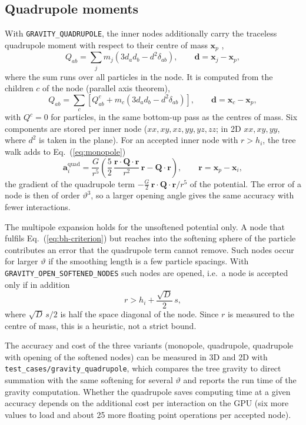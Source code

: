 \documentclass[10pt,fleqn,twoside]{article}
\renewcommand{\vec}[1]{{\mathbf #1}}
\newcommand{\code}[1]{\texttt{#1}}
\newcommand{\sw}[1]{\texttt{#1}}
\begin{document}
\subsection{Quadrupole moments}
\label{sec:quadrupole}
With \sw{GRAVITY\_QUADRUPOLE}, the inner nodes additionally carry the traceless quadrupole moment with respect to
their centre of mass $\vec x_p$ \citep{1987ApJS...64..715H},
\begin{equation}
 Q_{ab} = \sum_j m_j \left(3 d_a d_b - d^2 \delta_{ab}\right), \qquad \vec d = \vec x_j - \vec x_p,
\end{equation}
where the sum runs over all particles in the node. It is computed from the children $c$ of the node (parallel axis
theorem),
\begin{equation}
 Q_{ab} = \sum_c \left[ Q^c_{ab} + m_c \left(3 d_a d_b - d^2 \delta_{ab}\right)\right], \qquad
 \vec d = \vec x_c - \vec x_p,
\end{equation}
with $Q^c = 0$ for particles, in the same bottom-up pass as the centres of mass. Six components are stored per inner
node ($xx, xy, xz, yy, yz, zz$; in 2D $xx, xy, yy$, where $d^2$ is taken in the plane). For an accepted inner node
with $r > h_i$, the tree walk adds to Eq.~(\ref{eq:monopole})
\begin{equation}
 \vec a_i^\mathrm{quad} = \frac{G}{r^5}\left(\frac{5}{2}\,\frac{\vec r\cdot\mathbf Q\cdot\vec r}{r^2}\,\vec r
 - \mathbf Q\cdot\vec r\right), \qquad \vec r = \vec x_p - \vec x_i,
\end{equation}
the gradient of the quadrupole term $-\frac{G}{2}\,\vec r\cdot\mathbf Q\cdot\vec r/r^5$ of the potential. The
error of a node is then of order $\vartheta^3$, so a larger opening angle gives the same accuracy with fewer
interactions.

The multipole expansion holds for the unsoftened potential only. A node that fulfils Eq.~(\ref{eq:bh-criterion})
but reaches into the softening sphere of the particle contributes an error that the quadrupole term cannot remove.
Such nodes occur for larger $\vartheta$ if the smoothing length is a few particle spacings. With
\sw{GRAVITY\_OPEN\_SOFTENED\_NODES} such nodes are opened, i.e.\ a node is accepted only if in addition
\begin{equation}
 r > h_i + \frac{\sqrt{D}}{2}\, s,
\end{equation}
where $\sqrt{D}\,s/2$ is half the space diagonal of the node. Since $r$ is measured to the centre of mass, this is a
heuristic, not a strict bound.

The accuracy and cost of the three variants (monopole, quadrupole, quadrupole with opening of the softened nodes)
can be measured in 3D and 2D with \code{test\_cases/gravity\_quadrupole}, which compares the tree gravity to direct
summation with the same softening for several $\vartheta$ and reports the run time of the gravity computation.
Whether the quadrupole saves computing time at a given accuracy depends on the additional cost per interaction on
the GPU (six more values to load and about 25 more floating point operations per accepted node).
\end{document}
